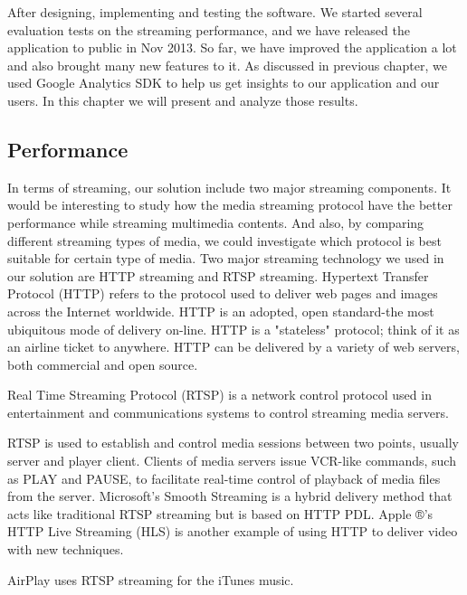 
After designing, implementing and testing the software. We started several
evaluation tests on the streaming performance, and we have released the
application to public in Nov 2013. So far, we have improved the application a
lot and also brought many new features to it. As discussed in previous chapter,
we used Google Analytics SDK to help us get insights to our application and our
users. In this chapter we will present and analyze those results.

\subsection{}
\subsection{Performance}
In terms of streaming, our solution include two major streaming components. It
would be interesting to study how the media streaming protocol have the better 
performance while streaming multimedia contents. And also, by comparing
different streaming types of media, we could investigate which protocol is best
suitable for certain type of media. Two major streaming technology we
used in our solution are HTTP streaming and RTSP streaming.
Hypertext Transfer Protocol (HTTP) refers to the protocol used to deliver web
pages and images across the Internet worldwide. HTTP is an adopted, open
standard-the most ubiquitous mode of delivery on-line. HTTP is a "stateless"
protocol; think of it as an airline ticket to anywhere. HTTP can be delivered
by a variety of web servers, both commercial and open source.

Real Time Streaming Protocol (RTSP) is a network control protocol used in
entertainment and communications systems to control streaming media servers.

RTSP is used to establish and control media sessions between two points,
usually server and player client. Clients of media servers issue VCR-like
commands, such as PLAY and PAUSE, to facilitate real-time control of playback
of media files from the server. Microsoft's Smooth Streaming is a hybrid
delivery method that acts like traditional RTSP streaming but is based on HTTP
PDL. Apple ®'s HTTP Live Streaming (HLS) is another example of using HTTP to
deliver video with new techniques.

AirPlay uses RTSP streaming for the iTunes music.


